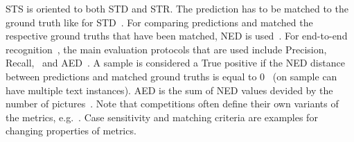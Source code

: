 \ac{STS} is oriented to both \ac{STD} and \ac{STR}.
The prediction has to be matched to the ground truth like for \ac{STD}~\citep{long_scene_2021}.
For comparing predictions and matched the respective ground truths that have been matched, \ac{NED}
is used~\citep{chen_text_2021}.
For end-to-end recognition~\citep{karatzas_icdar_2013,karatzas_icdar_2015}, the main evaluation
protocols that are used include Precision, Recall, \fone\ and \ac{AED}~\citep{chen_text_2021}.
A sample is considered a True positive if the \ac{NED} distance between predictions and
matched ground truths is equal to 0~\citep{sun_icdar_2019} (on sample can have multiple text
instances).
\ac{AED} is the sum of \ac{NED} values devided by the number of pictures~\citep{chen_text_2021}.
Note that competitions often define their own variants of the metrics,
e.g.~\cite{he_icpr2018_2018,shi_icdar2017_2017}.
Case sensitivity and matching criteria are examples for changing properties of metrics.

